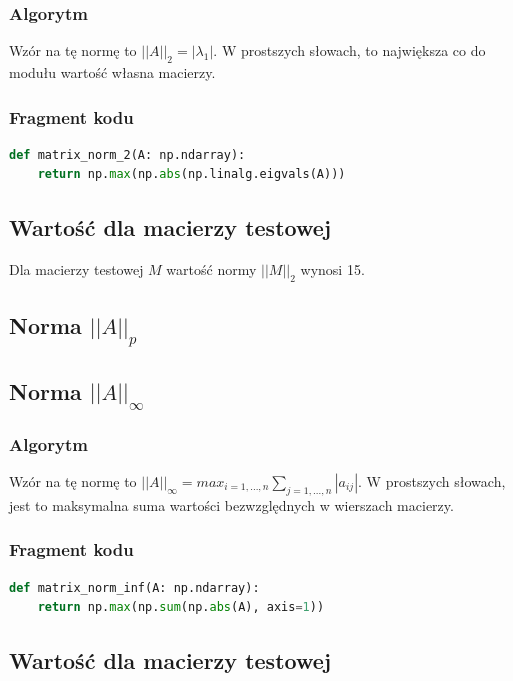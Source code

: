 \documentclass[a4paper]{article}
\begin{document}
\subsubsection{Algorytm}
Wzór na tę normę to
$||A||_2 = |{\lambda_{1}}|$. W prostszych słowach, to największa
co do modułu wartość własna macierzy.

\subsubsection{Fragment kodu}

\begin{lstlisting}[language=python]
def matrix_norm_2(A: np.ndarray):
    return np.max(np.abs(np.linalg.eigvals(A)))
\end{lstlisting}

\subsection{Wartość dla macierzy testowej}

Dla macierzy testowej $M$ wartość normy $||M||_2$ wynosi 15.

\subsection{Norma $||A||_p$}

\subsection{Norma $||A||_{\infty}$}

\subsubsection{Algorytm}
Wzór na tę normę to
$||A||_{\infty} = max_{i=1,...,n}\sum_{j=1,...,n}|a_{ij}|$. W prostszych słowach,
jest to maksymalna suma wartości bezwzględnych w wierszach macierzy.

\subsubsection{Fragment kodu}

\begin{lstlisting}[language=python]
def matrix_norm_inf(A: np.ndarray):
    return np.max(np.sum(np.abs(A), axis=1))
\end{lstlisting}

\subsection{Wartość dla macierzy testowej}
\end{document}
